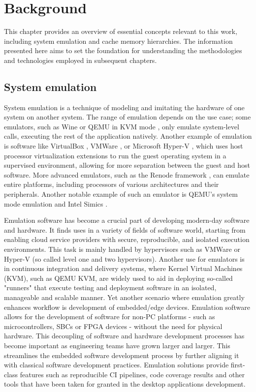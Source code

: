 
\chapter{Background}
This chapter provides an overview of essential concepts relevant to this work, including system emulation and cache memory hierarchies. The information presented here aims to set
the foundation for understanding the methodologies and technologies employed in subsequent chapters.

\section{System emulation}

System emulation is a technique of modeling and imitating the hardware of one system on another system. The range of emulation depends on the use case; some emulators, such as Wine \cite{Wine}
or QEMU in KVM mode \cite{QemuKVM}, only emulate system-level calls, executing the rest of the application natively. Another example of emulation is software like VirtualBox \cite{VirtualBox}, VMWare \cite{VMWareWorkstation}, or Microsoft
Hyper-V \cite{hyperv}, which uses host processor virtualization extensions to run the guest operating system in a supervised environment, allowing for more separation between the guest and host software.
More advanced emulators, such as the Renode framework \cite{Renode}, can emulate entire platforms, including processors of various architectures and their peripherals. Another notable example of
such an emulator is QEMU's system mode emulation \cite{Qemu} and Intel Simics \cite{simics}.

Emulation software has become a crucial part of developing modern-day software and hardware. It finds uses in a variety of fields of software world, starting from enabling cloud
service providers with secure, reproducible, and isolated execution environments. This task is mainly handled by hypervisors such as VMWare or Hyper-V (so called level one and two hypervisors).
Another use for emulators is in continuous integration and delivery systems, where Kernel Virtual Machines (KVM), such as QEMU KVM, are widely used to aid in deploying
so-called "runners" that execute testing and deployment software in an isolated, manageable and scalable manner. Yet another scenario where emulation greatly enhances workflow is
development of embedded/edge devices. Emulation software allows for the development of software for non-PC platforms - such as microcontrollers, SBCs or FPGA devices - without the
need for physical hardware. This decoupling of software and hardware development processes has become important as engineering teams have grown larger and larger. This streamlines the embedded software development process by
further aligning it with classical software development practices. Emulation solutions provide first-class features such as reproducible CI pipelines, code coverage results and
other tools that have been taken for granted in the desktop applications development.


